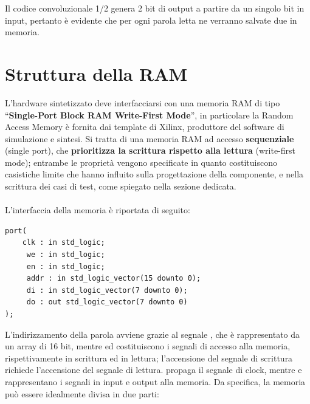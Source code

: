 Il codice convoluzionale 1/2 genera 2 bit di output a partire da un singolo bit in input, pertanto è evidente che per ogni parola letta ne verranno salvate due in memoria.


\section{Struttura della RAM}

L’hardware sintetizzato deve interfacciarsi con una memoria RAM di tipo “\textbf{Single-Port Block RAM Write-First Mode}”, in particolare la Random Access Memory è fornita dai template di Xilinx, produttore del software di simulazione e sintesi. Si tratta di una memoria RAM ad accesso \textbf{sequenziale} (single port), che \textbf{prioritizza la scrittura rispetto alla lettura} (write-first mode); entrambe le proprietà vengono specificate in quanto costituiscono casistiche limite che hanno influito sulla progettazione della componente, e nella scrittura dei casi di test, come spiegato nella sezione dedicata.
\\\\
L’interfaccia della memoria è riportata di seguito:\\
\begin{lstlisting}
port(
    clk : in std_logic;
	 we : in std_logic;
	 en : in std_logic;
	 addr : in std_logic_vector(15 downto 0);
	 di : in std_logic_vector(7 downto 0);
	 do : out std_logic_vector(7 downto 0)
);
\end{lstlisting}

L’indirizzamento della parola avviene grazie al segnale , che è rappresentato da un array di 16 bit, mentre  ed  costituiscono i segnali di accesso alla memoria, rispettivamente in scrittura ed in lettura; l’accensione del segnale di scrittura richiede l’accensione del segnale di lettura.  propaga il segnale di clock, mentre  e  rappresentano i segnali in input e output alla memoria.
Da specifica, la memoria può essere idealmente divisa in due parti:

